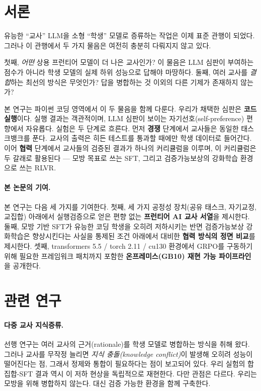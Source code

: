 \documentclass[11pt]{article}
\begin{document}
\section{서론}
유능한 ``교사'' LLM을 소형 ``학생'' 모델로 증류하는 작업은 이제 표준 관행이 되었다. 그러나 이 관행에서 두 가지 물음은 여전히 충분히 다뤄지지 않고 있다.

첫째, \emph{어떤} 상용 프런티어 모델이 더 나은 교사인가? 이 물음은 LLM 심판이 부여하는 점수가 아니라 학생 모델의 실제 하위 성능으로 답해야 마땅하다. 둘째, 여러 교사를 \emph{결합}하는 최선의 방식은 무엇인가? 답을 병합하는 것 이외의 다른 기제가 존재하지 않는가?

본 연구는 파이썬 코딩 영역에서 이 두 물음을 함께 다룬다. 우리가 채택한 심판은 \textbf{코드 실행}이다. 실행 결과는 객관적이며, LLM 심판이 보이는 자기선호(self-preference) 편향에서 자유롭다. 실험은 두 단계로 흐른다. 먼저 \textbf{경쟁} 단계에서 교사들은 동일한 태스크뱅크를 푼다. 교사의 출력은 히든 테스트를 통과할 때에만 학생 데이터로 들어간다. 이어 \textbf{협력} 단계에서 교사들의 검증된 결과가 하나의 커리큘럼을 이루며, 이 커리큘럼은 두 갈래로 활용된다 --- 모방 목표로 쓰는 SFT, 그리고 검증가능보상의 강화학습 환경으로 쓰는 RLVR.

\paragraph{본 논문의 기여.}
본 연구는 다음 세 가지를 기여한다. 첫째, 세 가지 공정성 장치(공유 태스크, 자기교정, 교집합) 아래에서 실행검증으로 얻은 편향 없는 \textbf{프런티어 AI 교사 서열}을 제시한다. 둘째, 모방 기반 SFT가 유능한 코딩 학생을 오히려 저하시키는 반면 검증가능보상 강화학습은 향상시킨다는 사실을 통제된 조건 아래에서 대비한 \textbf{협력 방식의 정면 비교}를 제시한다. 셋째, transformers 5.5 / torch 2.11 / cu130 환경에서 GRPO를 구동하기 위해 필요한 프레임워크 패치까지 포함한 \textbf{온프레미스(GB10) 재현 가능 파이프라인}을 공개한다.

\section{관련 연구}
\paragraph{다중 교사 지식증류.}
선행 연구는 여러 교사의 근거(rationale)를 학생 모델로 병합하는 방식을 취해 왔다. 그러나 교사를 무작정 늘리면 \emph{지식 충돌(knowledge conflict)}이 발생해 오히려 성능이 떨어진다는 점, 그래서 정제와 통합이 필요하다는 점이 보고되어 있다\citep{multiteacherkd}. 우리 실험의 합집합-SFT 결과 역시 이 저하 현상을 독립적으로 재현한다. 다만 관점은 다르다. 우리는 모방을 위해 병합하지 않는다. 대신 검증 가능한 환경을 함께 구축한다.
\end{document}
